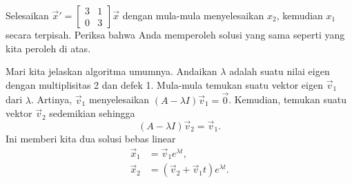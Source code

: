 \begin{exercise}
Selesaikan ${\vec{x}}' = \left[ \begin{smallmatrix}
3 & 1 \\ 0 & 3
\end{smallmatrix} \right] \vec{x}$ dengan mula-mula menyelesaikan $x_2$, kemudian
$x_1$ secara terpisah.  Periksa bahwa Anda memperoleh solusi yang sama seperti yang kita peroleh
di atas.
\end{exercise}

Mari kita jelaskan algoritma umumnya.  Andaikan $\lambda$ adalah suatu
nilai eigen dengan multiplisitas 2 dan defek 1.
Mula-mula temukan suatu vektor eigen $\vec{v}_1$ dari $\lambda$.  
Artinya, $\vec{v}_1$ menyelesaikan
$(A-\lambda I)\vec{v}_1  = \vec{0}$.
Kemudian, temukan suatu vektor $\vec{v}_2$ sedemikian sehingga
\begin{equation*}
(A-\lambda I)\vec{v}_2 = \vec{v}_1 .
\end{equation*}
Ini memberi kita dua solusi bebas linear
\begin{align*}
\vec{x}_1 & = \vec{v}_1 e^{\lambda t} , \\
\vec{x}_2 & = \left( \vec{v}_2 + \vec{v}_1 t \right) e^{\lambda t} .
\end{align*}

